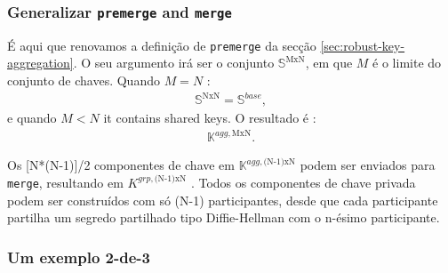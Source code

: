 \subsubsection*{Generalizar {\tt premerge} and {\tt merge}}

É aqui que renovamos a definição de {\tt premerge} da secção \ref{sec:robust-key-aggregation}. O seu argumento irá ser o conjunto $\mathbb{S}^{\textrm{MxN}}$, em que $M$ é o limite do conjunto de chaves. Quando $M = N$ :
\begin{align*}
\mathbb{S}^{\textrm{NxN}} = \mathbb{S}^{base} ,
\end{align*}
e quando $M < N$ it contains shared keys. O resultado é :
\begin{align*}
\mathbb{K}^{agg,\textrm{MxN}} .
\end{align*}

Os [N*(N-1)]/2 componentes de chave em $\mathbb{K}^{agg,\textrm{(N-1)xN}}$ podem ser enviados para {\tt merge}, resultando em $K^{grp,\textrm{(N-1)xN}}$ . Todos os componentes de chave privada podem ser construídos com só (N-1) participantes, desde que cada participante partilha um segredo partilhado tipo Diffie-Hellman com o n-ésimo participante.

\subsubsection*{Um exemplo 2-de-3}

